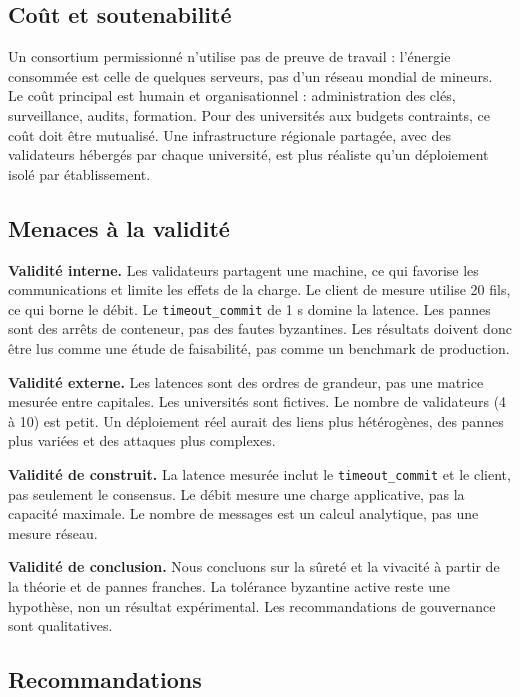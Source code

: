 \documentclass[conference]{IEEEtran}
\begin{document}
\subsection{Coût et soutenabilité}

Un consortium permissionné n'utilise pas de preuve de travail : l'énergie consommée est celle de quelques serveurs, pas d'un réseau mondial de mineurs. Le coût principal est humain et organisationnel : administration des clés, surveillance, audits, formation. Pour des universités aux budgets contraints, ce coût doit être mutualisé. Une infrastructure régionale partagée, avec des validateurs hébergés par chaque université, est plus réaliste qu'un déploiement isolé par établissement.

\subsection{Menaces à la validité}

\textbf{Validité interne.} Les validateurs partagent une machine, ce qui favorise les communications et limite les effets de la charge. Le client de mesure utilise 20 fils, ce qui borne le débit. Le \texttt{timeout\_commit} de 1 s domine la latence. Les pannes sont des arrêts de conteneur, pas des fautes byzantines. Les résultats doivent donc être lus comme une étude de faisabilité, pas comme un benchmark de production.

\textbf{Validité externe.} Les latences sont des ordres de grandeur, pas une matrice mesurée entre capitales. Les universités sont fictives. Le nombre de validateurs (4 à 10) est petit. Un déploiement réel aurait des liens plus hétérogènes, des pannes plus variées et des attaques plus complexes.

\textbf{Validité de construit.} La latence mesurée inclut le \texttt{timeout\_commit} et le client, pas seulement le consensus. Le débit mesure une charge applicative, pas la capacité maximale. Le nombre de messages est un calcul analytique, pas une mesure réseau.

\textbf{Validité de conclusion.} Nous concluons sur la sûreté et la vivacité à partir de la théorie et de pannes franches. La tolérance byzantine active reste une hypothèse, non un résultat expérimental. Les recommandations de gouvernance sont qualitatives.

\subsection{Recommandations}
\end{document}
